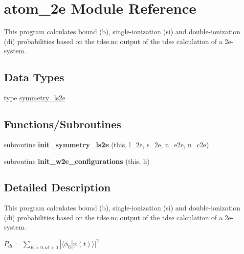 \hypertarget{namespaceatom__2e}{}\section{atom\+\_\+2e Module Reference}
\label{namespaceatom__2e}


This program calculates bound (b), single-\/ionization (si) and double-\/ionization (di) probabilities based on the tdse.\+nc output of the tdse calculation of a 2e-\/system.  


\subsection*{Data Types}
\begin{DoxyCompactItemize}
\item 
type \hyperlink{structatom__2e_1_1symmetry__ls2e}{symmetry\+\_\+ls2e}
\end{DoxyCompactItemize}
\subsection*{Functions/\+Subroutines}
\begin{DoxyCompactItemize}
\item 
subroutine {\bfseries init\+\_\+symmetry\+\_\+ls2e} (this, l\+\_\+2e, s\+\_\+2e, n\+\_\+e2e, n\+\_\+c2e)\hypertarget{namespaceatom__2e_ac0a52f564fdd200e5b94bba6c227bb33}{}\label{namespaceatom__2e_ac0a52f564fdd200e5b94bba6c227bb33}

\item 
subroutine {\bfseries init\+\_\+w2e\+\_\+configurations} (this, li)\hypertarget{namespaceatom__2e_aa5a953ad205e755aa0b4461603b89025}{}\label{namespaceatom__2e_aa5a953ad205e755aa0b4461603b89025}

\end{DoxyCompactItemize}


\subsection{Detailed Description}
This program calculates bound (b), single-\/ionization (si) and double-\/ionization (di) probabilities based on the tdse.\+nc output of the tdse calculation of a 2e-\/system. 

$ P_{di} = \sum_{E>0,nl>0} |\langle \phi_0|\psi(t) \rangle|^2$ 